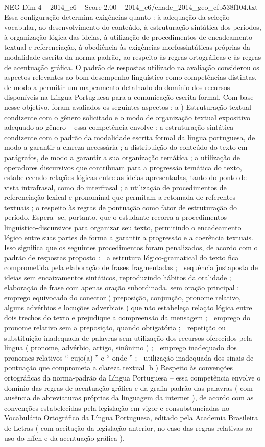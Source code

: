 \begin{textsample}{NEG Dim 4 – 2014\_c6 – Score 2.00 – 2014\_c6/enade\_2014\_geo\_cfb538f104.txt}
Essa configuração determina exigências quanto : à adequação da seleção vocabular, ao desenvolvimento do conteúdo, à estruturação sintática dos períodos, à organização lógica das ideias, à utilização de procedimentos de encadeamento textual e referenciação, à obediência às exigências morfossintáticas próprias da modalidade escrita da norma-padrão, ao respeito às regras ortográficas e às regras de acentuação gráfica.
O padrão de respostas utilizado na avaliação considerou os aspectos relevantes ao bom desempenho linguístico como competências distintas, de modo a permitir um mapeamento detalhado do domínio dos recursos disponíveis na Língua Portuguesa para a comunicação escrita formal.
Com base nesse objetivo, foram avaliados os seguintes aspectos : a ) Estruturação textual condizente com o gênero solicitado e o modo de organização textual expositivo adequado ao gênero – essa competência envolve : a estruturação sintática condizente com o padrão da modalidade escrita formal da língua portuguesa, de modo a garantir a clareza necessária ; a distribuição do conteúdo do texto em parágrafos, de modo a garantir a sua organização temática ; a utilização de operadores discursivos que contribuam para a progressão temática do texto, estabelecendo relações lógicas entre as ideias apresentadas, tanto do ponto de vista intrafrasal, como do interfrasal ; a utilização de procedimentos de referenciação lexical e pronominal que permitam a retomada de referentes textuais ; o respeito às regras de pontuação como fator de estruturação do período.
Espera -se, portanto, que o estudante recorra a procedimentos linguístico-discursivos para organizar seu texto, permitindo o encadeamento lógico entre suas partes de forma a garantir a progressão e a coerência textuais.
Isso significa que os seguintes procedimentos foram penalizados, de acordo com o padrão de respostas proposto :  a estrutura lógico-gramatical do texto fica comprometida pela elaboração de frases fragmentadas ;  sequência justaposta de ideias sem encaixamentos sintáticos, reproduzindo hábitos da oralidade ;  elaboração de frase com apenas oração subordinada, sem oração principal ;  emprego equivocado do conector ( preposição, conjunção, pronome relativo, alguns advérbios e locuções adverbiais ) que não estabeleça relação lógica entre dois trechos do texto e prejudique a compreensão da mensagem ;  emprego do pronome relativo sem a preposição, quando obrigatória ;  repetição ou substituição inadequada de palavras sem utilização dos recursos oferecidos pela língua ( pronome, advérbio, artigo, sinônimo ) ;  emprego inadequado dos pronomes relativos “ cujo(a) ” e “ onde ” ;  utilização inadequada dos sinais de pontuação que comprometa a clareza textual. b ) Respeito às convenções ortográficas da norma-padrão da Língua Portuguesa – essa competência envolve o domínio das regras de acentuação gráfica e da grafia padrão das palavras ( com ausência de abreviaturas próprias da linguagem da internet ), de acordo com as convenções estabelecidas pela legislação em vigor e consubstanciadas no Vocabulário Ortográfico da Língua Portuguesa, editado pela Academia Brasileira de Letras ( com aceitação da legislação anterior, no caso das regras relativas ao uso do hífen e da acentuação gráfica ).

\end{textsample}
